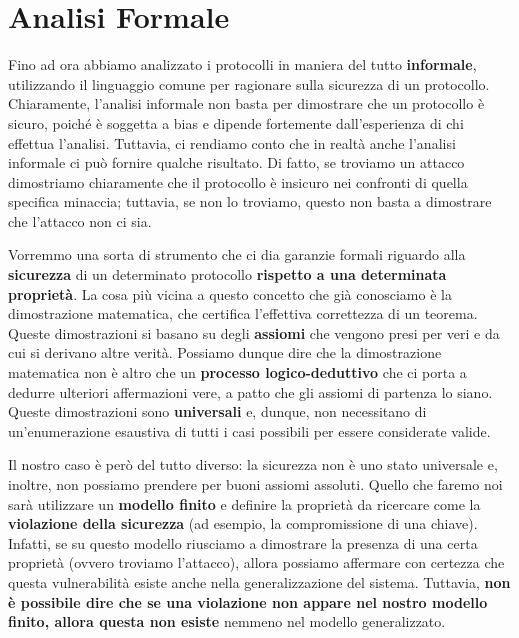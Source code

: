 \chapter{Analisi Formale}
Fino ad ora abbiamo analizzato i protocolli in maniera del tutto \textbf{informale}, utilizzando il linguaggio comune per ragionare sulla sicurezza di un protocollo. Chiaramente, l'analisi informale non basta per dimostrare che un protocollo è sicuro, poiché è soggetta a bias e dipende fortemente dall'esperienza di chi effettua l'analisi. 
Tuttavia, ci rendiamo conto che in realtà anche l'analisi informale ci può fornire qualche risultato. Di fatto, se troviamo un attacco dimostriamo chiaramente che il protocollo è insicuro nei confronti di quella specifica minaccia; tuttavia, se non lo troviamo, questo non basta a dimostrare che l'attacco non ci sia.

Vorremmo una sorta di strumento che ci dia garanzie formali riguardo alla \textbf{sicurezza} di un determinato protocollo \textbf{rispetto a una determinata proprietà}. La cosa più vicina a questo concetto che già conosciamo è la dimostrazione matematica, che certifica l'effettiva correttezza di un teorema. Queste dimostrazioni si basano su degli \textbf{assiomi} che vengono presi per veri e da cui si derivano altre verità. Possiamo dunque dire che la dimostrazione matematica non è altro che un \textbf{processo logico-deduttivo} che ci porta a dedurre ulteriori affermazioni vere, a patto che gli assiomi di partenza lo siano. Queste dimostrazioni sono \textbf{universali} e, dunque, non necessitano di un'enumerazione esaustiva di tutti i casi possibili per essere considerate valide.

Il nostro caso è però del tutto diverso: la sicurezza non è uno stato universale e, inoltre, non possiamo prendere per buoni assiomi assoluti. Quello che faremo noi sarà utilizzare un \textbf{modello finito} e definire la proprietà da ricercare come la \textbf{violazione della sicurezza} (ad esempio, la compromissione di una chiave). Infatti, se su questo modello riusciamo a dimostrare la presenza di una certa proprietà (ovvero troviamo l'attacco), allora possiamo affermare con certezza che questa vulnerabilità esiste anche nella generalizzazione del sistema. Tuttavia, \textbf{non è possibile dire che se una violazione non appare nel nostro modello finito, allora questa non esiste} nemmeno nel modello generalizzato.

